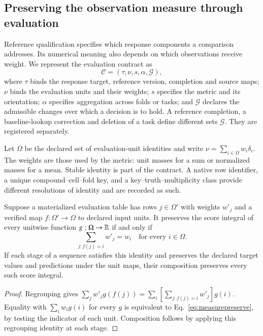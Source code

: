 \subsection{Preserving the observation measure through evaluation}\label{subsec:measure}
Reference qualification specifies which response components a comparison addresses. Its numerical meaning also depends on which observations receive weight. We represent the evaluation contract as
\begin{equation}\label{eq:comparisoncontract}
\mathcal C=(\tau,\nu,s,\alpha,\mathcal G),
\end{equation}
where $\tau$ binds the response target, reference version, completion and source maps; $\nu$ binds the evaluation units and their weights; $s$ specifies the metric and its orientation; $\alpha$ specifies aggregation across folds or tasks; and $\mathcal G$ declares the admissible changes over which a decision is to hold. A reference completion, a baseline-lookup correction and deletion of a task define different sets $\mathcal G$. They are registered separately.

Let $\Omega$ be the declared set of evaluation-unit identities and write $\nu=\sum_{i\in\Omega}w_i\delta_i$. The weights are those used by the metric: unit masses for a sum or normalized masses for a mean. Stable identity is part of the contract. A native row identifier, a unique compound--cell--fold key, and a key--truth--multiplicity class provide different resolutions of identity and are recorded as such.

\begin{proposition}\label{prop:measure}
Suppose a materialized evaluation table has rows $j\in\Omega'$ with weights $w'_j$ and a verified map $f:\Omega'\to\Omega$ to declared input units. It preserves the score integral of every unitwise function $g:\Omega\to\mathbb{R}$ if and only if
\begin{equation}\label{eq:measurepreserve}
\sum_{j:f(j)=i}w'_j=w_i\quad\text{for every }i\in\Omega.
\end{equation}
If each stage of a sequence satisfies this identity and preserves the declared target values and predictions under the unit maps, their composition preserves every such score integral.
\end{proposition}
\begin{proof}
Regrouping gives $\sum_jw'_jg(f(j))=\sum_i[\sum_{j:f(j)=i}w'_j]g(i)$. Equality with $\sum_iw_ig(i)$ for every $g$ is equivalent to Eq.~\eqref{eq:measurepreserve}, by testing the indicator of each unit. Composition follows by applying this regrouping identity at each stage.
\end{proof}

